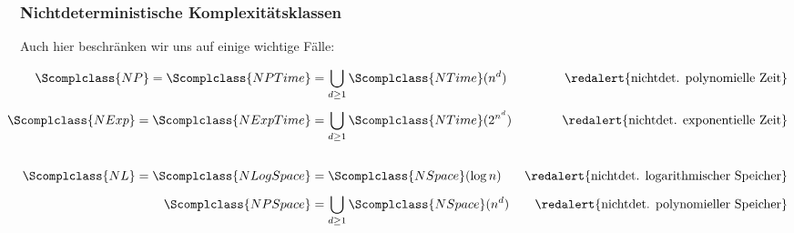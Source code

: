 \documentclass[aspectratio=1610,onlymath]{beamer}
\begin{document}
\begin{frame}\frametitle{Nichtdeterministische Komplexitätsklassen}

Auch hier beschränken wir uns auf einige wichtige Fälle:

{\footnotesize
\begin{align*}
\Scomplclass{NP} = \Scomplclass{NPTime} &= \bigcup_{d\geq 1} \Scomplclass{NTime}(n^d)
	& \text{\redalert{nichtdet. polynomielle Zeit}}
  \\[1ex]
\hspace{-1.5cm}\Scomplclass{NExp} = \Scomplclass{NExpTime} &= \bigcup_{d\geq 1} \Scomplclass{NTime}(2^{n^d})
    & \text{\redalert{nichtdet. exponentielle Zeit}}
   \\[4ex]
\hspace{-1.5cm}\Scomplclass{NL} = \Scomplclass{NLogSpace} &= \Scomplclass{NSpace}(\log n)
	& \text{\redalert{nichtdet. logarithmischer Speicher}}
  \\[1ex]
\Scomplclass{NPSpace} &= \bigcup_{d\geq 1} \Scomplclass{NSpace}(n^d)
	& \text{\redalert{nichtdet. polynomieller Speicher}}
\end{align*}
}\pause


\end{frame}
\end{document}
